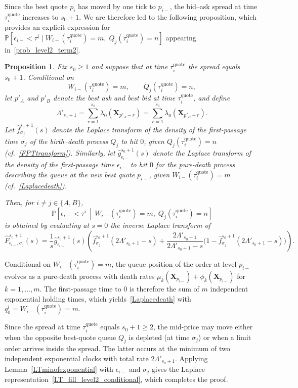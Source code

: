 \documentclass[11pt]{article}
\newtheorem{proposition}{Proposition}
\newenvironment{proof}{\noindent{\it Proof.}}{\hfill\fbox{}\vspace*{1mm}}
\begin{document}
Since the best quote $p_i$ has moved by one tick to $p_{i-}$, the bid--ask spread at time $\tau_i^{\text{quote}}$ increases to $s_0+1$. We are therefore led to the following proposition, which provides an explicit expression for 
$\mathbb{P}[\epsilon_{i-}<\tau^i \mid W_{i-}(\tau_i^{\text{quote}})=m,\; Q_j(\tau_i^{\text{quote}})=n]$ 
appearing in~\eqref{prob_level2_term2}.

\begin{proposition}\label{prop_2_level2}
Fix $s_0\geq 1$ and suppose that at time $\tau_i^{\text{quote}}$ the spread equals $s_0+1$. Conditional on
\[
W_{i-}(\tau_i^{\text{quote}})=m,
\qquad
Q_j(\tau_i^{\text{quote}})=n,
\]
let $p'_A$ and $p'_B$ denote the best ask and best bid at time $\tau_i^{\text{quote}}$, and define
\[
\Lambda'_{s_0+1}
=
\sum_{r=1}^{s_0}\lambda_0(\boldsymbol{X}_{p'_A-r})
=
\sum_{r=1}^{s_0}\lambda_0(\boldsymbol{X}_{p'_B+r}).
\]
Let $\hat{f}_{\sigma_j}^{s_0+1}(s)$ denote the Laplace transform of the density of the first-passage time $\sigma_j$ of the birth--death process $Q_j$ to hit $0$, given $Q_j(\tau_i^{\text{quote}})=n$ (cf.~\eqref{FPTtransform}). Similarly, let $\hat{g}_{\epsilon_{i-}}^{s_0+1}(s)$ denote the Laplace transform of the density of the first-passage time $\epsilon_{i-}$ to hit $0$ for the pure-death process describing the queue at the new best quote $p_{i-}$, given $W_{i-}(\tau_i^{\text{quote}})=m$ (cf.~\eqref{Laplacedeath}). 

Then, for $i\neq j\in\{A,B\}$,
\[
\mathbb{P}\!\left[\epsilon_{i-}<\tau^i \,\middle|\,
W_{i-}(\tau_i^{\text{quote}})=m,\;
Q_j(\tau_i^{\text{quote}})=n
\right]
\]
is obtained by evaluating at $s=0$ the inverse Laplace transform of
\begin{equation}\label{LT_fill_level2_conditional}
\hat{F}_{\epsilon_{i-},\sigma_j}^{s_0+1}(s)
=
\frac{1}{s}\hat{g}_{\epsilon_{i-}}^{s_0+1}(s)
\left(
\hat{f}_{\sigma_j}^{s_0+1}(2\Lambda'_{s_0+1}-s)
+
\frac{2\Lambda'_{s_0+1}}{2\Lambda'_{s_0+1}-s}
\bigl(1-\hat{f}_{\sigma_j}^{s_0+1}(2\Lambda'_{s_0+1}-s)\bigr)
\right).
\end{equation}
\end{proposition}


\begin{proof}
Conditional on $W_{i-}(\tau_i^{\text{quote}})=m$, the queue position of the order at level $p_{i-}$ evolves as a pure-death process with death rates $\mu_k(\boldsymbol{X}_{p_{i-}})+\phi_k(\boldsymbol{X}_{p_{i-}})$ for $k=1,\ldots,m$. The first-passage time to $0$ is therefore the sum of $m$ independent exponential holding times, which yields~\eqref{Laplacedeath} with $q_0^i=W_{i-}(\tau_i^{\text{quote}})=m$.

Since the spread at time $\tau_i^{\text{quote}}$ equals $s_0+1\geq 2$, the mid-price may move either when the opposite best-quote queue $Q_j$ is depleted (at time $\sigma_j$) or when a limit order arrives inside the spread. The latter occurs at the minimum of two independent exponential clocks with total rate $2\Lambda'_{s_0+1}$. Applying Lemma~\ref{LTminofexponential} with $\epsilon_{i-}$ and $\sigma_j$ gives the Laplace representation~\eqref{LT_fill_level2_conditional}, which completes the proof.
\end{proof}
\end{document}
